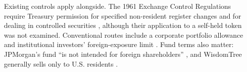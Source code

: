 \documentclass[12pt,a4paper]{article}
\begin{document}
Existing controls apply alongside. The 1961 Exchange Control Regulations require Treasury permission for specified non-resident register changes and for dealing in controlled securities \citep[reg~14(1)--(3), pp.~16--17]{ExConRegs1961}, although their application to a self-held token was not examined. Conventional routes include a corporate portfolio allowance and institutional investors' foreign-exposure limit \citep[B.2(C)(iii), pp.~60--61; B.2(H)(iv), p.~73]{ADManual2026}. Fund terms also matter: JPMorgan's fund ``is not intended for foreign shareholders'' \citep[p.~30, a tax warning]{JPMorganOnChainLTMMF2026}, and WisdomTree generally sells only to U.S. residents \citep[p.~145]{WisdomTreeTMMDF2025}.
\end{document}
